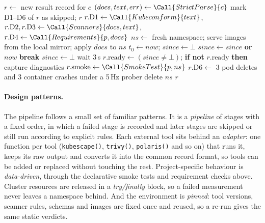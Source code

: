 \begin{algorithm}[t]
\caption{Evaluating one configuration $c$ of project $p$.}\label{alg:evaluate}
\small
\begin{algorithmic}[1]
\State $r \gets$ new result record for $c$
\State $(docs, text, err) \gets \Call{StrictParse}{c}$ 
  \State mark D1--D6 of $r$ as skipped; \Return $r$
\EndIf
\State $r.\mathrm{D1} \gets \Call{Kubeconform}{text}$,  
\State $r.\mathrm{D2}, r.\mathrm{D3} \gets \Call{Scanners}{docs, text}$, 
\State $r.\mathrm{D4} \gets \Call{Requirements}{p, docs}$
\State $ns \gets$ fresh namespace; serve images from the local mirror; apply $docs$ to $ns$
\State $t_0 \gets now$; $since \gets \bot$
    \State $since \gets since$ \textbf{or} $now$
      \State \textbf{break}
    \EndIf
  \Else
    \State $since \gets \bot$
  \EndIf
  \State wait 3\,s
\EndWhile
\State $r.\mathrm{ready} \gets (since \neq \bot)$; \textbf{if not} $r.\mathrm{ready}$ \textbf{then} capture diagnostics
\State $r.\mathrm{smoke} \gets \Call{SmokeTest}{p, ns}$ 
  \State $r.\mathrm{D6} \gets$ 3 pod deletes and 3 container crashes under a 5\,Hz prober
\EndIf
\State delete $ns$ 
\State \Return $r$
\end{algorithmic}
\end{algorithm}

\paragraph{Design patterns.} The pipeline follows a small set of familiar patterns. It is a \emph{pipeline} of stages with a fixed order, in which a failed stage is recorded and later stages are skipped or still run according to explicit rules. Each external tool sits behind an \emph{adapter}: one function per tool (\texttt{kubescape()}, \texttt{trivy()}, \texttt{polaris()} and so on) that runs it, keeps its raw output and converts it into the common record format, so tools can be added or replaced without touching the rest. Project-specific behaviour is \emph{data-driven}, through the declarative smoke tests and requirement checks above. Cluster resources are released in a \emph{try/finally} block, so a failed measurement never leaves a namespace behind. And the environment is \emph{pinned}: tool versions, scanner rules, schemas and images are fixed once and reused, so a re-run gives the same static verdicts.

